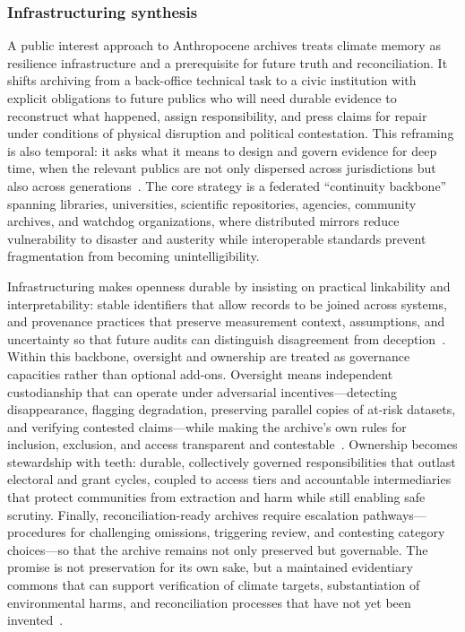 \documentclass[acmsmall,screen]{acmart}
\begin{document}
\subsubsection*{Infrastructuring synthesis}
A public interest approach to Anthropocene archives treats climate memory as resilience infrastructure and a prerequisite for future truth and reconciliation. It shifts archiving from a back-office technical task to a civic institution with explicit obligations to future publics who will need durable evidence to reconstruct what happened, assign responsibility, and press claims for repair under conditions of physical disruption and political contestation. This reframing is also temporal: it asks what it means to design and govern evidence for deep time, when the relevant publics are not only dispersed across jurisdictions but also across generations~\cite{holtorfCulturalHeritageFuture2020,rahm-skagebyHCIDeepTime2022,hanuschDeeptimeOrganizationsLearning2020}. The core strategy is a federated “continuity backbone” spanning libraries, universities, scientific repositories, agencies, community archives, and watchdog organizations, where distributed mirrors reduce vulnerability to disaster and austerity while interoperable standards prevent fragmentation from becoming unintelligibility. 

Infrastructuring makes openness durable by insisting on practical linkability and interpretability: stable identifiers that allow records to be joined across systems, and provenance practices that preserve measurement context, assumptions, and uncertainty so that future audits can distinguish disagreement from deception~\cite{yeoConceptsRecord12007,josiasUnderstandingArchivesFeature2011}. Within this backbone, oversight and ownership are treated as governance capacities rather than optional add-ons. Oversight means independent custodianship that can operate under adversarial incentives—detecting disappearance, flagging degradation, preserving parallel copies of at-risk datasets, and verifying contested claims—while making the archive’s own rules for inclusion, exclusion, and access transparent and contestable~\cite{blankeReassemblingDigitalArchives2024,ghaddarSpectreArchiveTruth2016}. Ownership becomes stewardship with teeth: durable, collectively governed responsibilities that outlast electoral and grant cycles, coupled to access tiers and accountable intermediaries that protect communities from extraction and harm while still enabling safe scrutiny. Finally, reconciliation-ready archives require escalation pathways—procedures for challenging omissions, triggering review, and contesting category choices—so that the archive remains not only preserved but governable. The promise is not preservation for its own sake, but a maintained evidentiary commons that can support verification of climate targets, substantiation of environmental harms, and reconciliation processes that have not yet been invented~\cite{viebachEvidenceUseArchives2022,robinson-sweetTruthReconciliationArchivists2018}.
\end{document}
